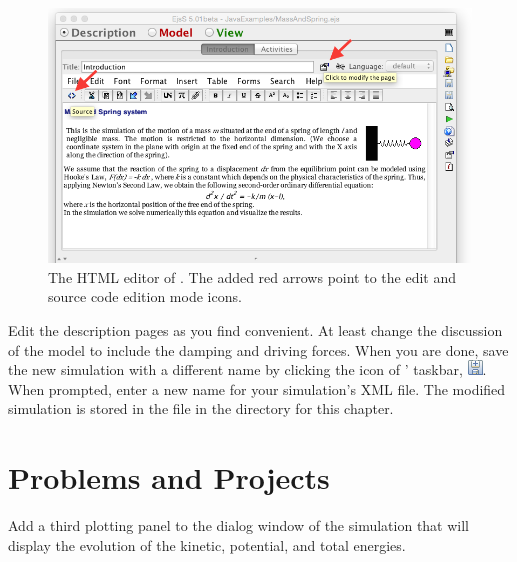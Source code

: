 \begin{figure}[htb]
    \centering
  \includegraphics[scale=\scale]{02ExplorationJava/images/ModifyHTML.png}
    \caption{The HTML editor of \ejs. The added red arrows point to the edit and source code edition mode icons.}
    \label{fig:02ExplorationJava/ModifyHTML}
\end{figure}

Edit the description pages as you find convenient. At least change the discussion of the model to include the damping and driving forces. When you are done, save the new simulation with a different name by clicking the  icon of \ejs' taskbar, \includegraphics[scale=\linescale]{../_common/icons_png/saveAsSmall.png}. When prompted, enter a new name for your simulation's XML file. The modified simulation is stored in the  file in the  directory for this chapter.

\section{Problems and Projects}\label{section:02ExplorationJavaProjects}

\begin{problem}[Energy]
Add a third plotting panel to the dialog window of the  simulation that will display the evolution of the kinetic, potential, and total energies.
\end{problem}

